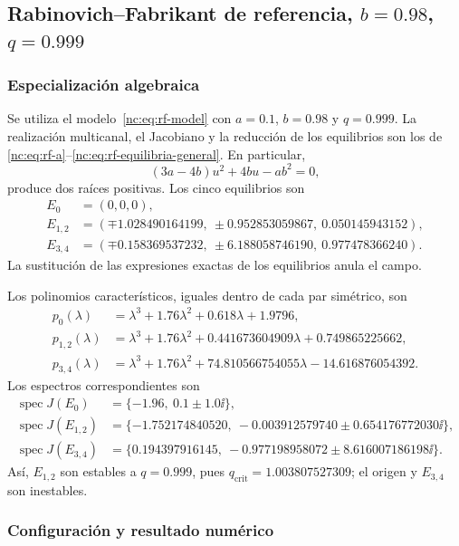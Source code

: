 \subsection{Rabinovich--Fabrikant de referencia,
\texorpdfstring{\(b=0.98\), \(q=0.999\)}{b=0.98, q=0.999}}

\subsubsection*{Especialización algebraica}

Se utiliza el modelo~\eqref{nc:eq:rf-model} con \(a=0.1\), \(b=0.98\) y
\(q=0.999\). La realización multicanal, el Jacobiano y la reducción de los
equilibrios son los de
\eqref{nc:eq:rf-a}--\eqref{nc:eq:rf-equilibria-general}. En particular,
\begin{equation}
 (3a-4b)u^2+4bu-ab^2=0,
\end{equation}
produce dos raíces positivas. Los cinco equilibrios son
\begin{align}
 E_0&=(0,0,0),\\
 E_{1,2}&=(\mp1.028490164199,\ \pm0.952853059867,\ 0.050145943152),\\
 E_{3,4}&=(\mp0.158369537232,\ \pm6.188058746190,\ 0.977478366240).
\end{align}
La sustitución de las expresiones exactas de los equilibrios anula el campo.

Los polinomios característicos, iguales dentro de cada par simétrico, son
\begin{align}
 p_0(\lambda)&=\lambda^3+1.76\lambda^2+0.618\lambda+1.9796,\\
 p_{1,2}(\lambda)&=\lambda^3+1.76\lambda^2
 +0.441673604909\lambda+0.749865225662,\\
 p_{3,4}(\lambda)&=\lambda^3+1.76\lambda^2
 +74.810566754055\lambda-14.616876054392.
\end{align}
Los espectros correspondientes son
\begin{align}
 \operatorname{spec}J(E_0)&=
 \{-1.96,\ 0.1\pm1.0\ii\},\\
 \operatorname{spec}J(E_{1,2})&=
 \{-1.752174840520,\ -0.003912579740
 \pm0.654176772030\ii\},\\
 \operatorname{spec}J(E_{3,4})&=
 \{0.194397916145,\ -0.977198958072
 \pm8.616007186198\ii\}.
\end{align}
Así, \(E_{1,2}\) son estables a \(q=0.999\), pues
\(q_{\mathrm{crit}}=1.003807527309\); el origen y \(E_{3,4}\) son inestables.

\subsubsection*{Configuración y resultado numérico}

